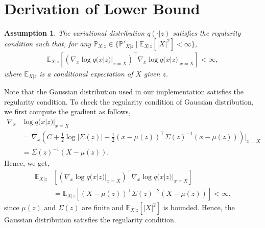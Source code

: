 \newtheorem{assumption}{Assumption}

\appendix

\section{Derivation of Lower Bound}
\label{sec:derivation_of_lower_bound}
\begin{assumption}
The variational distribution $q(\cdot|z)$ satisfies the regularity condition such that, 
for any $\mathbb{P}_{X|z}\in\{\mathbb{P}'_{X|z}\mid \mathbb{E}_{X|z}[|X|^{2}] < \infty\}$,
\begin{align}
    \mathbb{E}_{X|z}\left[\left(\nabla_{x} \log q(x|z)|_{x=X}\right)^{\intercal}\nabla_{x} \log q(x|z)|_{x=X}\right] < \infty,
\end{align}
where $\mathbb{E}_{X|z}$ is a conditional expectation of $X$ given $z$.
\end{assumption}
\begin{remark}
Note that the Gaussian distribution used in our implementation satisfies the regularity condition.
To check the regularity condition of Gaussian distribution, we first compute the gradient as follows,
\begin{align}
    \nabla_{x}& \log q(x|z)|_{x=X}\\
    &= \nabla_{x} \left(C+\frac{1}{2}\log |\Sigma(z)| + \frac{1}{2}(x-\mu(z))^{\intercal}\Sigma(z)^{-1}(x-\mu(z))\right) |_{x=X}\\
    &= \Sigma(z)^{-1}(X-\mu(z)).
\end{align}
Hence, we get,
\begin{align}
    \mathbb{E}_{X|z}&\left[\left(\nabla_{x} \log q(x|z)|_{x=X}\right)^{\intercal}\nabla_{x} \log q(x|z)|_{x=X}\right]\\
    &= \mathbb{E}_{X|z}\left[(X-\mu(z))^{\intercal}\Sigma(z)^{-2}(X-\mu(z))\right] < \infty.
\end{align}
since $\mu(z)$ and $\Sigma(z)$ are finite and $\mathbb{E}_{X|z}[|X|^{2}]$ is bounded.
Hence, the Gaussian distribution satisfies the regularity condition.
\end{remark}

